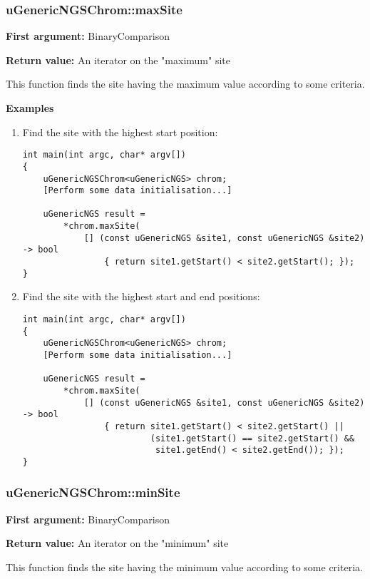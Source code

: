 \documentclass[letterpaper,10pt]{article}
\begin{document}
\subsubsection{uGenericNGSChrom::maxSite}
\textbf{First argument:} BinaryComparison

\noindent{}\textbf{Return value:} An iterator on the "maximum" site

\bigskip
\noindent{}This function finds the site having the maximum value according to some criteria.

\bigskip
\noindent{}\textbf{Examples}
\begin{enumerate}
 \item Find the site with the highest start position:
\begin{verbatim}
int main(int argc, char* argv[])
{
    uGenericNGSChrom<uGenericNGS> chrom;
    [Perform some data initialisation...]

    uGenericNGS result = 
        *chrom.maxSite(
            [] (const uGenericNGS &site1, const uGenericNGS &site2) -> bool
                { return site1.getStart() < site2.getStart(); });
}
\end{verbatim}

 \item Find the site with the highest start and end positions:
\begin{verbatim}
int main(int argc, char* argv[])
{
    uGenericNGSChrom<uGenericNGS> chrom;
    [Perform some data initialisation...]

    uGenericNGS result = 
        *chrom.maxSite(
            [] (const uGenericNGS &site1, const uGenericNGS &site2) -> bool
                { return site1.getStart() < site2.getStart() || 
                         (site1.getStart() == site2.getStart() && 
                          site1.getEnd() < site2.getEnd()); });
}
\end{verbatim}
\end{enumerate}

\subsubsection{uGenericNGSChrom::minSite}
\textbf{First argument:} BinaryComparison

\noindent{}\textbf{Return value:} An iterator on the "minimum" site

\bigskip
\noindent{}This function finds the site having the minimum value according to some criteria.
\end{document}
